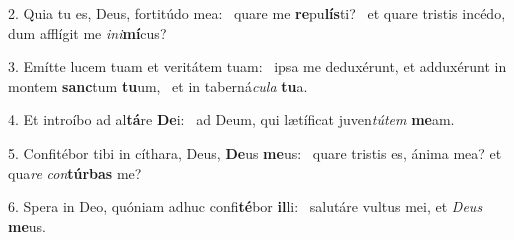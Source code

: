 2. Quia tu es, Deus, fortitúdo mea: \dag\  quare me \textbf{re}pu\textbf{lís}ti? \ast\  et quare tristis incédo, dum afflígit me \textit{in}\textit{i}\textbf{mí}cus?\

3. Emítte lucem tuam et veritátem tuam: \dag\  ipsa me deduxérunt, et adduxérunt in montem \textbf{sanc}tum \textbf{tu}um, \ast\  et in taberná\textit{cu}\textit{la} \textbf{tu}a.\

4. Et introíbo ad al\textbf{tá}re \textbf{De}i: \ast\  ad Deum, qui lætíficat juven\textit{tú}\textit{tem} \textbf{me}am.\

5. Confitébor tibi in cíthara, Deus, \textbf{De}us \textbf{me}us: \ast\  quare tristis es, ánima mea? et qua\textit{re} \textit{con}\textbf{túr}\textbf{bas} me?\

6. Spera in Deo, quóniam adhuc confi\textbf{té}bor \textbf{il}li: \ast\  salutáre vultus mei, et \textit{De}\textit{us} \textbf{me}us.\

